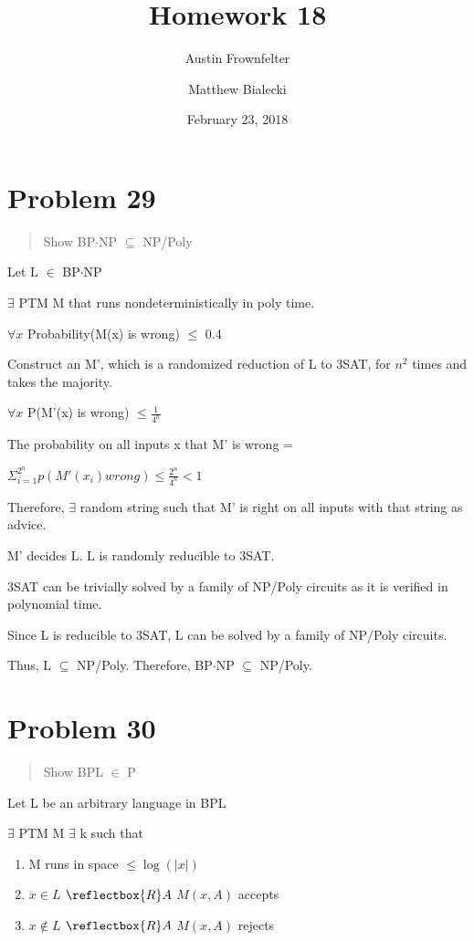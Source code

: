 \documentclass{article}
\title{Homework 18}
\author{Austin Frownfelter \and Matthew Bialecki}
\date{February 23, 2018}
\begin{document}
\maketitle

\section{Problem 29}
\begin{quote}
Show BP$\cdot$NP $\subseteq$ NP/Poly
\end{quote}

Let L $\in$ BP$\cdot$NP

\medskip
$\exists$ PTM M that runs nondeterministically in poly time.  

$\forall x$ Probability(M(x) is wrong) $\leq$ 0.4

\medskip
Construct an M', which is a randomized reduction of L to 3SAT, for $n^2$ times and takes the majority.

$\forall x$ P(M'(x) is wrong) $\leq \frac1{4^n}$

The probability on all inputs x that M' is wrong = 

\-\hspace{20px}$\Sigma_{i=1}^{2^n} p(M'(x_i) wrong) \leq \frac{2^n}{4^n} < 1$

Therefore, $\exists$ random string such that M' is right on all inputs with that string as advice.

M' decides L. L is randomly reducible to 3SAT.  

3SAT can be trivially solved by a family of NP/Poly circuits as it is verified in polynomial time.  

Since L is reducible to 3SAT, L can be solved by a family of NP/Poly circuits.

Thus, L $\subseteq$ NP/Poly.  Therefore, BP$\cdot$NP $\subseteq$ NP/Poly.

\section{Problem 30}
\begin{quote}
Show BPL $\in$ P
\end{quote}

Let L be an arbitrary language in BPL

$\exists$ PTM M $\exists$ k such that 
\begin{enumerate}
\item M runs in space $\leq \log(|x|)$
\item $x\in L$ $\reflectbox{R}A$ $M(x,A)$ accepts
\item $x\notin L$ $\reflectbox{R}A$ $M(x,A)$ rejects
\end{enumerate}
\end{document}
